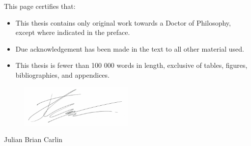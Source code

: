 This page certifies that:
\begin{itemize}
\item This thesis contains only original work towards a Doctor of Philosophy, except where indicated in the preface.
\item Due acknowledgement has been made in the text to all other material used.
\item This thesis is fewer than 100 000 words in length, exclusive of tables, figures, bibliographies, and appendices.
\end{itemize}

\vspace{3cm}

\begin{figure}[h!]
  \raggedleft
  \includegraphics[width=0.5\textwidth]{figures/signature.png}
\end{figure}
\begin{flushright}
Julian Brian Carlin
\end{flushright}
